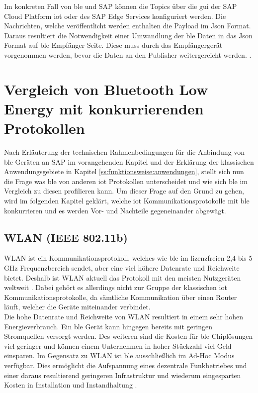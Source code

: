 \noindent Im konkreten Fall von \ac{ble} und SAP können die Topics über die \ac{gui} der SAP Cloud Platform \ac{iot} oder des SAP Edge Services konfiguriert werden. Die Nachrichten, welche veröffentlicht werden enthalten die Payload im Json Format. Daraus resultiert die Notwendigkeit einer Umwandlung der \ac{ble} Daten in das Json Format auf \ac{ble} Empfänger Seite. Diese muss durch das Empfängergerät vorgenommen werden, bevor die Daten an den Publisher weitergereicht werden. \cite[Seite 247]{Holtschulte20:IOS}.\\ 

\section{Vergleich von Bluetooth Low Energy mit konkurrierenden Protokollen}
\label{s:vergleich} 

\noindent Nach Erläuterung der technischen Rahmenbedingungen für die Anbindung von \ac{ble} Geräten an SAP im vorangehenden Kapitel und der Erklärung der klassischen Anwendungsgebiete in Kapitel \ref{ss:funktionsweise:anwendungen}, stellt sich nun die Frage was \ac{ble} von anderen \ac{iot} Protokollen unterscheidet und wie sich \ac{ble} im Vergleich zu diesen profilieren kann. Um dieser Frage auf den Grund zu gehen, wird im folgenden Kapitel geklärt, welche \ac{iot} Kommunikationsprotokolle mit \ac{ble} konkurrieren und es werden Vor- und Nachteile gegeneinander abgewägt.\\ 

\subsection{WLAN (IEEE 802.11b)}
\label{ss:vergleich:wlan}

\noindent WLAN ist ein Kommunikationsprotokoll, welches wie \ac{ble} im lizenzfreien 2,4 bis 5 GHz Frequenzbereich sendet, aber eine viel höhere Datenrate und Reichweite bietet. Deshalb ist WLAN aktuell das Protokoll mit den meisten Nutzgeräten weltweit \cite[Seite 193f]{Gessler15:WNN}. Dabei gehört es allerdings nicht zur Gruppe der klassischen \ac{iot} Kommunikationsprotokolle, da sämtliche Kommunikation über einen Router läuft, welcher die Geräte miteinander verbindet.\\

\noindent Die hohe Datenrate und Reichweite von WLAN resultiert in einem sehr hohen Energieverbrauch. Ein \ac{ble} Gerät kann hingegen bereits mit geringen Stromquellen versorgt werden. Des weiteren sind die Kosten für \ac{ble} Chiplösungen viel geringer und können einem Unternehmen in hoher Stückzahl viel Geld einsparen. Im Gegensatz zu WLAN ist \ac{ble} ausschließlich im Ad-Hoc Modus verfügbar. Dies ermöglicht die Aufspannung eines dezentrale Funkbetriebes und einer daraus resultierend geringeren Infrastruktur und wiederum eingesparten Kosten in Installation und Instandhaltung \cite[Seite 206]{Gessler15:WNN}.\\

